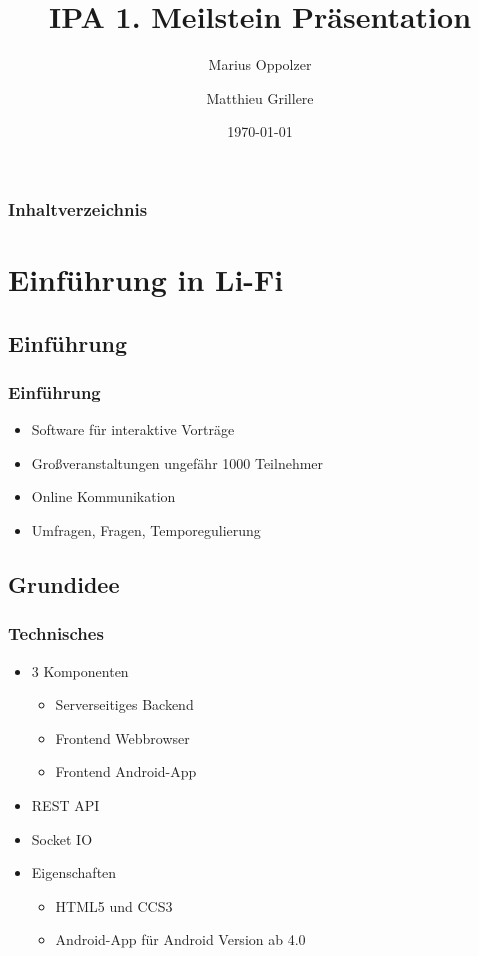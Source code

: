 \documentclass[german,a4paper]{beamer}
\title{IPA 1. Meilstein Pr\"{a}sentation}
\author{Marius Oppolzer \and Matthieu Grillere}
\date{\today}
\begin{document}
\maketitle{}
\begin{frame}
\frametitle{Inhaltverzeichnis}
\tableofcontents[pausesections]
\end{frame}
 
\section{Einf\"{u}hrung in Li-Fi}
\subsection{Einf\"{u}hrung}
\begin{frame} 
\frametitle{Einf\"{u}hrung}
\begin{itemize}
  \item 
  Software f\"{u}r interaktive Vortr\"{a}ge
  \item
  Gro{\ss}veranstaltungen ungef\"{a}hr 1000 Teilnehmer
  \item
  Online Kommunikation
  \item
  Umfragen, Fragen, Temporegulierung
\end{itemize}
\end{frame}

\subsection{Grundidee}
\begin{frame} 
\frametitle{Technisches}
\begin{itemize}
  \item 
  3 Komponenten
  \begin{itemize}
    \item
    Serverseitiges Backend
    \item
    Frontend Webbrowser
    \item
    Frontend Android-App
  \end{itemize}
  \item 
  REST API
  \item
  Socket IO
  \item
  Eigenschaften
  \begin{itemize}
    \item
    HTML5 und CCS3
    \item
    Android-App f\"{u}r Android Version ab 4.0
  \end{itemize}
\end{itemize}
\end{frame}
\end{document}
